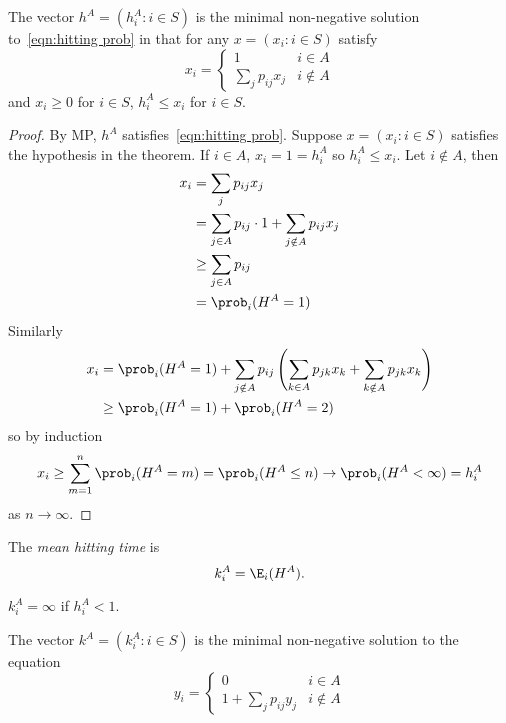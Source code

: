 \documentclass[a4paper]{article}
\begin{document}
\begin{theorem}
  The vector \(h^A = (h_i^A: i \in S)\) is the minimal non-negative solution to~\eqref{eqn:hitting prob} in that for any \(x = (x_i: i \in S)\) satisfy
  \[
    x_i =
    \begin{cases}
      1 & i \in A \\
      \sum_j p_{ij}x_j & i \notin A
    \end{cases}
  \]
  and \(x_i \geq 0\) for \(i \in S\), \(h_i^A \leq x_i\) for \(i \in S\).
\end{theorem}

\begin{proof}
  By MP, \(h^A\) satisfies~\eqref{eqn:hitting prob}. Suppose \(x = (x_i: i \in S)\) satisfies the hypothesis in the theorem. If \(i \in A\), \(x_i = 1 = h_i^A\) so \(h_i^A \leq x_i\). Let \(i \notin A\), then
  \begin{align*}
    x_i &= \sum_j p_{ij}x_j \\
        &= \sum_{j \in A}p_{ij}\cdot 1 + \sum_{j \notin A} p_{ij}x_j \\
        &\geq \sum_{j \in A} p_{ij} \\
        &= \prob_i(H^A = 1)
  \end{align*}
  Similarly
  \begin{align*}
    x_i &= \prob_i(H^A = 1)  + \sum_{j \notin A}^{ } p_{ij} \left( \sum_{k \in A}^{ } p_{jk}x_k + \sum_{k \notin A}^{ } p_{jk}x_k \right) \\
        &\geq \prob_i(H^A = 1) + \prob_i(H^A = 2)
  \end{align*}
  so by induction
  \[
    x_i \geq \sum_{m = 1}^{n} \prob_i(H^A = m) = \prob_i(H^A \leq n) \to \prob_i(H^A < \infty) = h_i^A
  \]
  as \(n \to \infty\).
\end{proof}

\begin{definition}
  The \emph{mean hitting time} is
  \[
    k_i^A = \E_i(H^A).
  \]
\end{definition}

\begin{note}
  \(k_i^A = \infty\) if \(h_i^A < 1\).
\end{note}

\begin{theorem}
  The vector \(k^A = (k_i^A: i \in S)\) is the minimal non-negative solution to the equation
  \begin{equation}
    \label{eqn:hitting time}
    y_i =
    \begin{cases}
      0 & i \in A \\
      1 + \sum_{j}^{ } p_{ij}y_j & i \notin A
    \end{cases}
    \tag{\(\dag\)}
  \end{equation}
\end{theorem}
\end{document}
